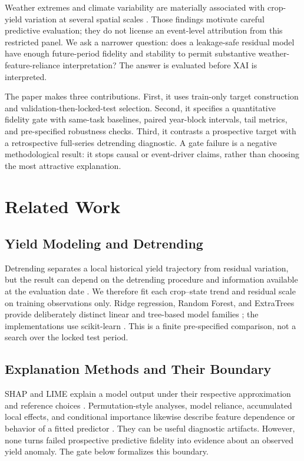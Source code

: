 \documentclass[conference]{IEEEtran}
\begin{document}
Weather extremes and climate variability are materially associated with crop-yield
variation at several spatial scales \cite{Lesk2016,Ray2015,Lobell2011,SchlenkerRoberts2009,Zampieri2017,Vogel2019,Heino2023,Schierhorn2021,Sjulgard2023}.
Those findings motivate careful predictive evaluation; they do not license an
event-level attribution from this restricted panel. We ask a narrower question:
does a leakage-safe residual model have enough future-period fidelity and stability
to permit substantive weather-feature-reliance interpretation? The answer is
evaluated before XAI is interpreted.

The paper makes three contributions. First, it uses train-only target construction
and validation-then-locked-test selection. Second, it specifies a quantitative
fidelity gate with same-task baselines, paired year-block intervals, tail metrics,
and pre-specified robustness checks. Third, it contrasts a prospective target with
a retrospective full-series detrending diagnostic. A gate failure is a negative
methodological result: it stops causal or event-driver claims, rather than choosing
the most attractive explanation.

\section{Related Work}
\subsection{Yield Modeling and Detrending}
Detrending separates a local historical yield trajectory from residual variation,
but the result can depend on the detrending procedure and information available at
the evaluation date \cite{Lu2017,Meng2024}. We therefore fit each crop--state trend
and residual scale on training observations only. Ridge regression, Random Forest,
and ExtraTrees provide deliberately distinct linear and tree-based model families
\cite{HoerlKennard1970,Breiman2001,Geurts2006}; the implementations use
scikit-learn \cite{Pedregosa2011}. This is a finite pre-specified comparison, not
a search over the locked test period.

\subsection{Explanation Methods and Their Boundary}
SHAP and LIME explain a model output under their respective approximation and
reference choices \cite{LundbergLee2017,Ribeiro2016}. Permutation-style analyses,
model reliance, accumulated local effects, and conditional importance likewise
describe feature dependence or behavior of a fitted predictor
\cite{Fisher2019,ApleyZhu2020,Strobl2008}. They can be useful diagnostic artifacts.
However, none turns failed prospective predictive fidelity into evidence about an
observed yield anomaly. The gate below formalizes this boundary.
\end{document}
